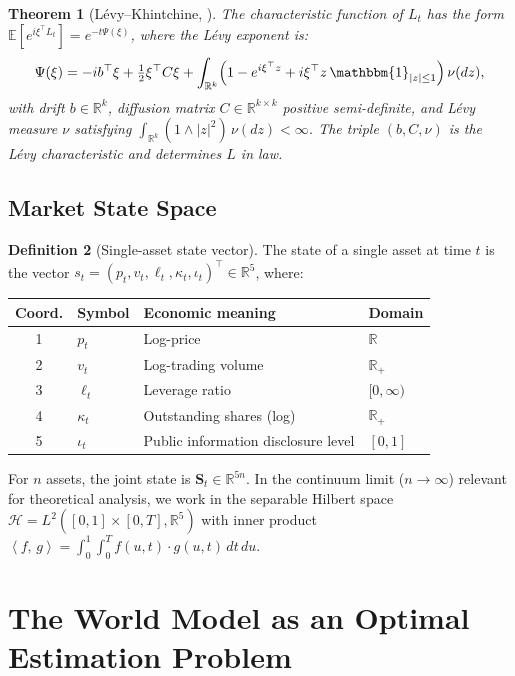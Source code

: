 \documentclass[12pt,a4paper]{article}
\theoremstyle{plain}
\newtheorem{theorem}{Theorem}[section]
\theoremstyle{definition}
\newtheorem{definition}[theorem]{Definition}
\newcommand{\R}{\mathbb{R}}
\newcommand{\E}{\mathbb{E}}
\newcommand{\Hil}{\mathcal{H}}
\newcommand{\1}{\mathbbm{1}}
\newcommand{\inner}[2]{\left\langle #1,\, #2 \right\rangle}
\begin{document}
\begin{theorem}[Lévy--Khintchine, \citealt{Sato1999}]
\label{thm:LK}
The characteristic function of $L_t$ has the form
$\E[e^{i\xi^\top L_t}] = e^{-t\Psi(\xi)}$, where the Lévy exponent is:
\[
\Psi(\xi)
= -i b^\top \xi
  + \tfrac{1}{2}\xi^\top C\xi
  + \int_{\R^k}\!\left(1 - e^{i\xi^\top z} + i\xi^\top z\,\1_{|z|\leq 1}\right)
    \nu(dz),
\]
with \emph{drift} $b \in \R^k$, \emph{diffusion matrix}
$C \in \R^{k\times k}$ positive semi-definite, and
\emph{Lévy measure} $\nu$ satisfying
$\int_{\R^k}(1 \wedge |z|^2)\,\nu(dz) < \infty$.
The triple $(b,C,\nu)$ is the \emph{Lévy characteristic} and determines $L$
in law.
\end{theorem}

\subsection{Market State Space}

\begin{definition}[Single-asset state vector]
\label{def:state_vector}
The state of a single asset at time $t$ is the vector
$s_t = (p_t, v_t, \ell_t, \kappa_t, \iota_t)^\top \in \R^5$, where:
\begin{center}
\begin{tabular}{clll}
\toprule
Coord. & Symbol & Economic meaning & Domain \\
\midrule
1 & $p_t$ & Log-price & $\R$ \\
2 & $v_t$ & Log-trading volume & $\R_+$ \\
3 & $\ell_t$ & Leverage ratio & $[0,\infty)$ \\
4 & $\kappa_t$ & Outstanding shares (log) & $\R_+$ \\
5 & $\iota_t$ & Public information disclosure level & $[0,1]$ \\
\bottomrule
\end{tabular}
\end{center}
\end{definition}

For $n$ assets, the joint state is $\mathbf{S}_t \in \R^{5n}$.
In the continuum limit ($n \to \infty$) relevant for theoretical analysis, we
work in the separable Hilbert space
$\Hil = L^2([0,1]\times[0,T],\R^5)$ with inner product
$\inner{f}{g} = \int_0^1\!\int_0^T f(u,t)\cdot g(u,t)\,dt\,du$.

\section{The World Model as an Optimal Estimation Problem}
\label{sec:world_model}
\end{document}
